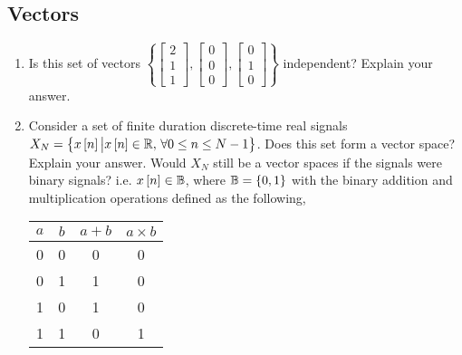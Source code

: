 
\subsection*{Vectors}
\begin{enumerate}
    \item Is this set of vectors $\left\{\begin{bmatrix}2 \\ 1 \\ 1\end{bmatrix}, \begin{bmatrix}0 \\ 0\\ 0\end{bmatrix}, \begin{bmatrix}0 \\ 1 \\ 0\end{bmatrix}\right\}$ independent? Explain your answer.

    \item Consider a set of finite duration discrete-time real signals $X_N = \left\{ x\left[ n\right] \big\vert x\left[ n\right] \in \mathbb{R}, \,\forall 0 \leq n \leq N-1\right\}$. Does this set form a vector space? Explain your answer. Would $X_N$ still be a vector spaces if the signals were binary signals? i.e. $x\left[ n\right] \in \mathbb{B}$, where $\mathbb{B} = \left\{ 0, 1\right\}$ with the binary addition and multiplication operations defined as the following,

    \begin{minipage}[h]{.45\textwidth}
        \centering
        \begin{tabular}{|c|c|c|c|}
        \hline
        $a$ & $b$ & $a+b$ & $a \times b$ \\ \hline
        0 & 0 & 0   & 0     \\ \hline
        0 & 1 & 1   & 0     \\ \hline
        1 & 0 & 1   & 0     \\ \hline
        1 & 1 & 0   & 1     \\ \hline
        \end{tabular}\\
    \end{minipage}


\end{enumerate}
